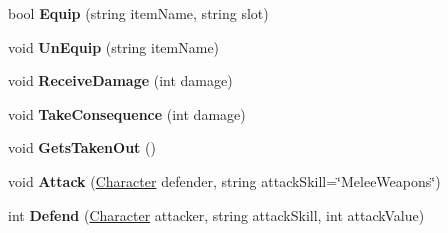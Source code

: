 \begin{DoxyCompactItemize}
\item 
\hypertarget{class_dungeon_crawler_1_1_character_1_1_character_aca573a4b41896e50ccf46d2dafe7e266}{}bool {\bfseries Equip} (string item\+Name, string slot)\label{class_dungeon_crawler_1_1_character_1_1_character_aca573a4b41896e50ccf46d2dafe7e266}

\item 
\hypertarget{class_dungeon_crawler_1_1_character_1_1_character_a625216059f7c3d1dfa61bd93ac32c8be}{}void {\bfseries Un\+Equip} (string item\+Name)\label{class_dungeon_crawler_1_1_character_1_1_character_a625216059f7c3d1dfa61bd93ac32c8be}

\item 
\hypertarget{class_dungeon_crawler_1_1_character_1_1_character_af4d0724811374b91bb6257b4fef2cb9a}{}void {\bfseries Receive\+Damage} (int damage)\label{class_dungeon_crawler_1_1_character_1_1_character_af4d0724811374b91bb6257b4fef2cb9a}

\item 
\hypertarget{class_dungeon_crawler_1_1_character_1_1_character_a6c2305e906fbcf5b7bd581c7f695318d}{}void {\bfseries Take\+Consequence} (int damage)\label{class_dungeon_crawler_1_1_character_1_1_character_a6c2305e906fbcf5b7bd581c7f695318d}

\item 
\hypertarget{class_dungeon_crawler_1_1_character_1_1_character_ae2d528e5a50f9cc930a8d1561800ec75}{}void {\bfseries Gets\+Taken\+Out} ()\label{class_dungeon_crawler_1_1_character_1_1_character_ae2d528e5a50f9cc930a8d1561800ec75}

\item 
\hypertarget{class_dungeon_crawler_1_1_character_1_1_character_a30c222f247a9a27fb69d5cb3cb9f5b30}{}void {\bfseries Attack} (\hyperlink{class_dungeon_crawler_1_1_character_1_1_character}{Character} defender, string attack\+Skill=\char`\"{}Melee\+Weapons\char`\"{})\label{class_dungeon_crawler_1_1_character_1_1_character_a30c222f247a9a27fb69d5cb3cb9f5b30}

\item 
\hypertarget{class_dungeon_crawler_1_1_character_1_1_character_a0fae904150f11f772ee3d837afd0d9cc}{}int {\bfseries Defend} (\hyperlink{class_dungeon_crawler_1_1_character_1_1_character}{Character} attacker, string attack\+Skill, int attack\+Value)\label{class_dungeon_crawler_1_1_character_1_1_character_a0fae904150f11f772ee3d837afd0d9cc}

\end{DoxyCompactItemize}
